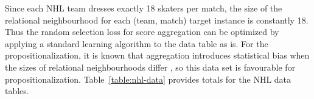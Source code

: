 \documentclass[oribibl]{llncs}%
\newcommand{\team}{T}
\newcommand{\player}{P}
\newcommand{\match}{M}
\begin{document}
%

Since each NHL team dresses exactly 18 skaters per match, the size of the relational neighbourhood for each (team, match) target instance is constantly 18. Thus the random selection loss for score aggregation can be optimized by applying a standard learning algorithm to the data table as is. For the propositionalization, it is known that aggregation introduces statistical bias when the sizes of relational neighbourhoods differ \cite{DavidJensen2002}, so this data set is favourable for propositionalization.
%
Table~\ref{table:nhl-data} provides totals for the NHL data tables.
\end{document}
